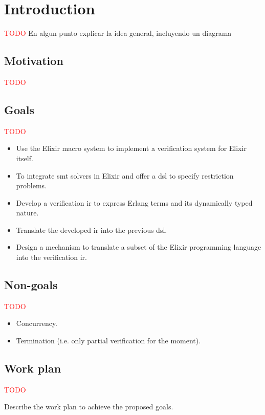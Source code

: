 \chapter{Introduction}
\label{cap:introduction}


\textcolor{red}{TODO} 
En algun punto explicar la idea general, incluyendo un diagrama

\section{Motivation}

\textcolor{red}{TODO}

\section{Goals}

\textcolor{red}{TODO}

\begin{itemize}
  \item Use the Elixir macro system to implement a verification system 
    for Elixir itself.
  \item To integrate \acrshort{smt} solvers in Elixir and offer a \gls{dsl} 
    to specify restriction problems.
  \item Develop a verification \gls{ir} to express Erlang terms and its 
    dynamically typed nature.
  \item Translate the developed \gls{ir} into the previous \gls{dsl}.
  \item Design a mechanism to translate a subset of the Elixir 
    programming language into the verification \gls{ir}.
\end{itemize}

\section{Non-goals}

\textcolor{red}{TODO}

\begin{itemize}
  \item Concurrency.
  \item Termination (i.e. only partial verification for the moment).
\end{itemize}

\section{Work plan}

\textcolor{red}{TODO}

Describe the work plan to achieve the proposed goals.
